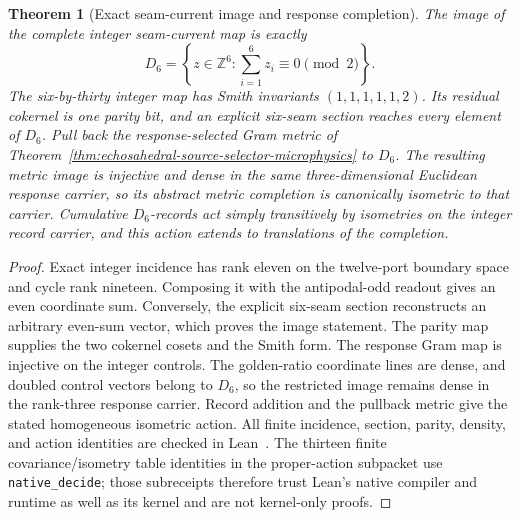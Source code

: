 \documentclass[11pt]{article}
\newtheorem{theorem}{Theorem}[section]
\theoremstyle{remark}
\theoremstyle{plain}
\begin{document}
\begin{theorem}[Exact seam-current image and response completion]
\label{thm:seam-current-response-completion}
The image of the complete integer seam-current map is exactly
\[
D_6=\left\{z\in\mathbb Z^6:
  \sum_{i=1}^{6}z_i\equiv0\pmod 2\right\}.
\]
The six-by-thirty integer map has Smith invariants
\((1,1,1,1,1,2)\). Its residual cokernel is one parity bit, and an explicit
six-seam section reaches every element of \(D_6\). Pull back the
response-selected Gram metric of Theorem~\ref{thm:echosahedral-source-selector-microphysics}
to \(D_6\). The resulting metric image is injective and dense in the same
three-dimensional Euclidean response carrier, so its abstract metric
completion is canonically isometric to that carrier. Cumulative
\(D_6\)-records act simply transitively by isometries on the integer record
carrier, and this action extends to translations of the completion.
\end{theorem}

\begin{proof}
Exact integer incidence has rank eleven on the twelve-port boundary space and
cycle rank nineteen. Composing it with the antipodal-odd readout gives an
even coordinate sum. Conversely, the explicit six-seam section reconstructs
an arbitrary even-sum vector, which proves the image statement. The parity
map supplies the two cokernel cosets and the Smith form. The response Gram
map is injective on the integer controls. The golden-ratio coordinate lines
are dense, and doubled control vectors belong to \(D_6\), so the restricted
image remains dense in the rank-three response carrier. Record addition and
the pullback metric give the stated homogeneous isometric action. All finite
incidence, section, parity, density, and action identities are checked in
Lean~\cite{ophrepo}. The thirteen finite covariance/isometry table identities
in the proper-action subpacket use \texttt{native\_decide}; those subreceipts
therefore trust Lean's native compiler and runtime as well as its kernel and
are not kernel-only proofs.
\end{proof}
\end{document}

